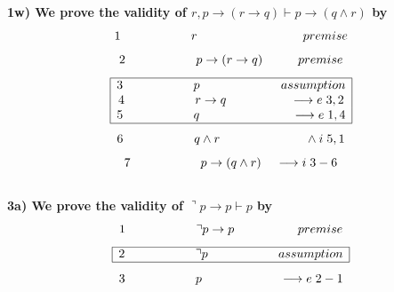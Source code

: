 \documentclass[a4paper]{article}
\begin{document}
\textbf{{\large\hspace{1 cm} 1w) We prove the validity of $r,p \rightarrow (r \rightarrow q) \vdash p \rightarrow (q\wedge r)$ by}}
{\large $$1 \hspace{2 cm} r \hspace{3 cm} premise$$ $$2 \hspace{2 cm} p \rightarrow (r \rightarrow q) \hspace{1 cm} premise$$
$$\begin{array}{|c|}
\hline 
\textcolor{black}{3 \hspace{2 cm} p \hspace{2.3 cm} assumption}\\ 

\textcolor{black}{4 \hspace{2 cm} r \rightarrow q \hspace{1.8 cm} \longrightarrow e\hspace{0.1 cm} 3,2}\\ 

\textcolor{black}{5 \hspace{2 cm} q \hspace{2.6 cm} \longrightarrow e\hspace{0.1 cm} 1,4}\\ 
\hline
\end{array}$$ $$6 \hspace{2 cm}  q \wedge r \hspace{2.4 cm} \wedge i\hspace{0.1 cm} 5,1$$ $$7 \hspace{2 cm} p \rightarrow (q\wedge r) \hspace{0.4 cm} \longrightarrow i\hspace{0.1 cm} 3-6$$}\\

\textbf{{\large\hspace{1 cm} 3a) We prove the validity of $\urcorner p \rightarrow p \vdash p$ by}}
{\large $$1 \hspace{2 cm} \urcorner p \rightarrow p \hspace{1.8 cm} premise$$ 
$$\begin{array}{|c|}
\hline 
\textcolor{black}{2 \hspace{2 cm} \urcorner p \hspace{2 cm} assumption}\\
\hline
\end{array}$$ $$3 \hspace{2 cm}  p \hspace{2.2 cm} \longrightarrow e\hspace{0.1 cm} 2-1$$}
\end{document}
